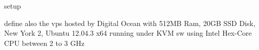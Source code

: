 setup

define also the vps hosted by Digital Ocean with 512MB Ram,  20GB SSD Disk, New York 2,  Ubuntu 12.04.3 x64 running under KVM sw using Intel Hex-Core CPU between 2 to 3 GHz 
